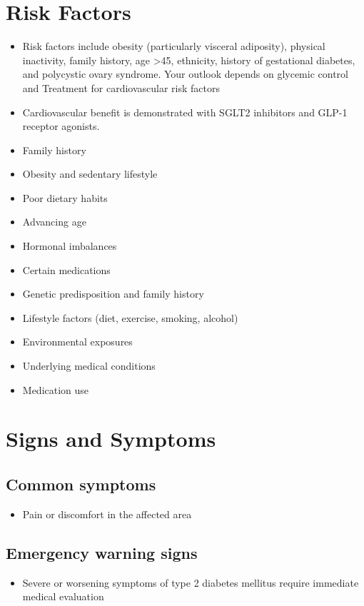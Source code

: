 \section{Risk Factors}
\begin{itemize}[noitemsep]
  \item Risk factors include obesity (particularly visceral adiposity), physical inactivity, family history, age >45, ethnicity, history of gestational diabetes, and polycystic ovary syndrome. Your outlook depends on glycemic control and Treatment for cardiovascular risk factors
  \item Cardiovascular benefit is demonstrated with SGLT2 inhibitors and GLP-1 receptor agonists.
  \item Family history
  \item Obesity and sedentary lifestyle
  \item Poor dietary habits
  \item Advancing age
  \item Hormonal imbalances
  \item Certain medications
  \item Genetic predisposition and family history
  \item Lifestyle factors (diet, exercise, smoking, alcohol)
  \item Environmental exposures
  \item Underlying medical conditions
  \item Medication use
\end{itemize}
\section{Signs and Symptoms}
\subsection{Common symptoms}
\begin{itemize}[noitemsep]
  \item Pain or discomfort in the affected area
  \end{itemize}
\subsection{Emergency warning signs}
\begin{itemize}[noitemsep]
  \item Severe or worsening symptoms of type 2 diabetes mellitus require immediate medical evaluation
\end{itemize}
